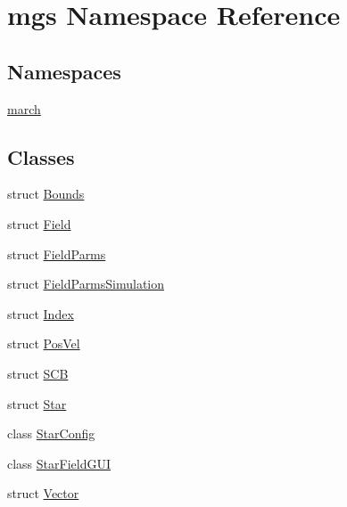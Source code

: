 \hypertarget{namespacemgs}{}\section{mgs Namespace Reference}
\label{namespacemgs}
\subsection*{Namespaces}
\begin{DoxyCompactItemize}
\item 
 \hyperlink{namespacemgs_1_1march}{march}
\end{DoxyCompactItemize}
\subsection*{Classes}
\begin{DoxyCompactItemize}
\item 
struct \hyperlink{structmgs_1_1Bounds}{Bounds}
\item 
struct \hyperlink{structmgs_1_1Field}{Field}
\item 
struct \hyperlink{structmgs_1_1FieldParms}{Field\+Parms}
\item 
struct \hyperlink{structmgs_1_1FieldParmsSimulation}{Field\+Parms\+Simulation}
\item 
struct \hyperlink{structmgs_1_1Index}{Index}
\item 
struct \hyperlink{structmgs_1_1PosVel}{Pos\+Vel}
\item 
struct \hyperlink{structmgs_1_1SCB}{S\+CB}
\item 
struct \hyperlink{structmgs_1_1Star}{Star}
\item 
class \hyperlink{classmgs_1_1StarConfig}{Star\+Config}
\item 
class \hyperlink{classmgs_1_1StarFieldGUI}{Star\+Field\+G\+UI}
\item 
struct \hyperlink{structmgs_1_1Vector}{Vector}
\end{DoxyCompactItemize}
